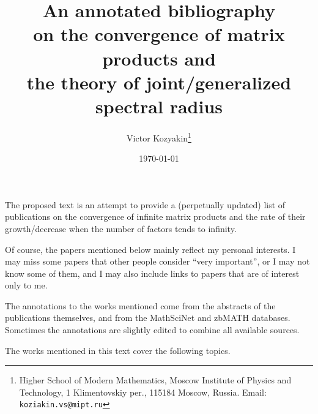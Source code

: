 \documentclass[a4paper,fleqn]{article}
\begin{document}
\title{\bf An annotated bibliography\\ on the convergence of matrix products and\\ the theory of joint/generalized spectral radius}

\author{Victor Kozyakin\thanks{Higher School of Modern Mathematics, Moscow 
Institute of Physics and Technology, 1 Klimentovskiy per., 115184 Moscow, 
Russia. Email: \texttt{koziakin.vs@mipt.ru}}}

\date{\today}

\maketitle

%
The proposed text is an attempt to provide a (perpetually updated) list of publications on the convergence of infinite matrix products and the rate of their growth/decrease when the number of factors tends to infinity.

Of course, the papers mentioned below mainly reflect my personal interests. I may miss some papers that other people consider ``very important'', or I may not know some of them, and I may also include links to papers that are of interest only to me.

The annotations to the works mentioned come from the abstracts of the publications themselves, and from the MathSciNet and zbMATH databases. Sometimes the annotations are slightly edited to combine all available sources.

The works mentioned in this text cover the following topics.
\end{document}
